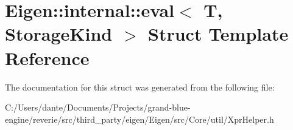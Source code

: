 \hypertarget{struct_eigen_1_1internal_1_1eval}{}\section{Eigen\+::internal\+::eval$<$ T, Storage\+Kind $>$ Struct Template Reference}
\label{struct_eigen_1_1internal_1_1eval}


The documentation for this struct was generated from the following file\+:\begin{DoxyCompactItemize}
\item 
C\+:/\+Users/dante/\+Documents/\+Projects/grand-\/blue-\/engine/reverie/src/third\+\_\+party/eigen/\+Eigen/src/\+Core/util/Xpr\+Helper.\+h\end{DoxyCompactItemize}
